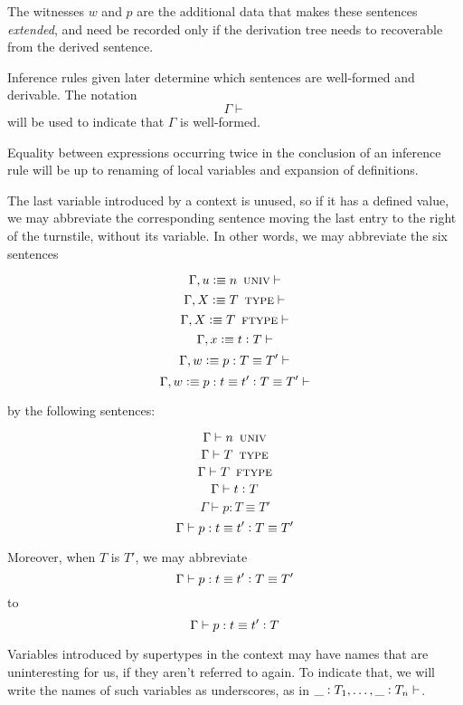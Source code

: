 \documentclass[11pt]{article}
\newcommand{\eqd}{\equiv}
\newcommand{\ccolon}{\vcentcolon}
\newcommand{\ccheck}{\vcentcolon}            %
\newcommand{\csynth}{\vcentcolon\vcentcolon} %
\renewcommand{\csynth}{\ccheck}              %
\newcommand{\UNIV}{\mathop{\text{ \sc univ}}}
\newcommand{\TYPE}{\mathop{\text{ \sc type}}}
\newcommand{\FTYPE}{\mathop{\text{ \sc ftype}}}
\newcommand{\Okay}{\mathop{\text{ \sc okay}}}
\newcommand{\Context}{\vdash\Okay}
\renewcommand{\Context}{\vdash}
\newcommand{\var}{\char`_}
\newcommand{\defn}{\vcentcolon\equiv}
\begin{document}
The witnesses $w$ and $p$ are the additional data that makes these sentences
{\em extended}, and need be recorded only if the derivation tree needs to
recoverable from the derived sentence.

Inference rules given later determine which sentences are well-formed and
derivable.  The notation $$\Gamma \Context$$ will be used to indicate that
$\Gamma$ is well-formed.

Equality between expressions occurring twice in the conclusion of an inference
rule will be up to renaming of local variables and expansion of definitions.

The last variable introduced by a context is unused, so if it has a defined
value, we may abbreviate the corresponding sentence moving the last entry to
the right of the turnstile, without its variable.  In other words, we may
abbreviate the six sentences

$$ \Gamma, u \defn n \UNIV \Context $$
$$ \Gamma, X \defn T \TYPE \Context $$
$$ \Gamma, X \defn T \FTYPE \Context $$
$$ \Gamma, x \defn t \ccolon T \Context $$
$$ \Gamma, w \defn p : T \eqd T' \Context $$
$$ \Gamma, w \defn p : t \eqd t' \ccolon T \eqd T' \Context $$

by the following sentences:

$$ \Gamma \vdash n \UNIV $$
$$ \Gamma \vdash T \TYPE $$
$$ \Gamma \vdash T \FTYPE $$
$$ \Gamma \vdash t \ccolon T $$
$$ \Gamma \vdash p : T \eqd T' $$
$$ \Gamma \vdash p : t \eqd t' \ccolon T \eqd T' $$

Moreover, when $T$ is $T'$, we may abbreviate
$$ \Gamma \vdash p : t \eqd t' \ccolon T \eqd T' $$
to
$$ \Gamma \vdash p : t \eqd t' \ccolon T $$

Variables introduced by supertypes in the context may have names that are
uninteresting for us, if they aren't referred to again.  To indicate that, we
will write the names of such variables as underscores, as in $\var
\ccolon T_1,\dots,\var \ccolon T_n\Context$.





\end{document}
